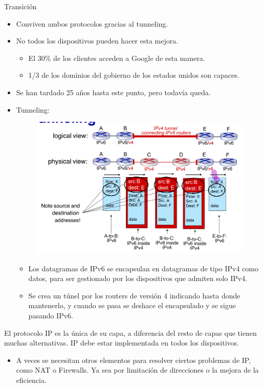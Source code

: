 \documentclass[12pt, twoside, openright]{report} %
\begin{document}
Transición

\begin{itemize}
	\item Conviven ambos protocolos gracias al tunneling.
	\item No todos los dispositivos pueden hacer esta mejora.

	      \begin{itemize}
		      \item El 30\% de los clientes acceden a Google de esta manera.
		      \item 1/3 de los dominios del gobierno de los estados unidos son
		            capaces.
	      \end{itemize}
	\item Se han tardado 25 años hasta este punto, pero todavía queda.
	\item Tunneling:
	      \begin{figure}[H]
		      {\includegraphics[scale=.3]{Untitled 37.png}}
	      \end{figure}
	      \begin{itemize}
		      \item Los datagramas de IPv6 se encapsulan en datagramas de tipo IPv4
		            como datos, para ser gestionado por los dispositivos que admiten
		            solo IPv4.
		      \item Se crea un túnel por los routers de versión 4 indicando hasta
		            donde mantenerlo, y cuando se pasa se deshace el encapsulado y se
		            sigue pasando IPv6.
	      \end{itemize}
\end{itemize}

El protocolo IP es la única de su capa, a diferencia del resto de
capas que tienen muchas alternativas. IP debe estar implementada en
todos los dispositivos.
\begin{itemize}
	\item A veces se necesitan otros elementos para resolver ciertos problemas
	      de IP, como NAT o Firewalls. Ya sea por limitación de direcciones o
	      la mejora de la eficiencia.
\end{itemize}
\end{document}
